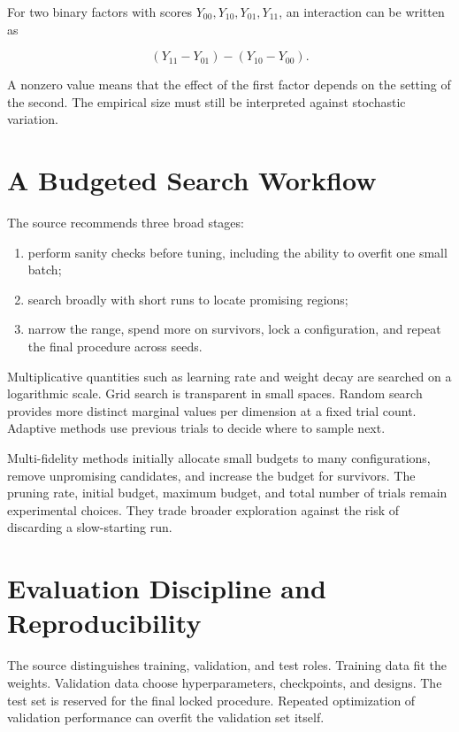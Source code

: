 \documentclass{article}
\begin{document}
For two binary factors with scores $Y_{00},Y_{10},Y_{01},Y_{11}$, an interaction can
be written as

\[
(Y_{11}-Y_{01})-(Y_{10}-Y_{00}).
\]

A nonzero value means that the effect of the first factor depends on the setting of
the second. The empirical size must still be interpreted against stochastic
variation.

\section{A Budgeted Search Workflow}

The source recommends three broad stages:

\begin{enumerate}
\item perform sanity checks before tuning, including the ability to overfit one small
batch;
\item search broadly with short runs to locate promising regions;
\item narrow the range, spend more on survivors, lock a configuration, and repeat the
final procedure across seeds.
\end{enumerate}

Multiplicative quantities such as learning rate and weight decay are searched on a
logarithmic scale. Grid search is transparent in small spaces. Random search provides
more distinct marginal values per dimension at a fixed trial count. Adaptive methods
use previous trials to decide where to sample next.

Multi-fidelity methods initially allocate small budgets to many configurations, remove
unpromising candidates, and increase the budget for survivors. The pruning rate,
initial budget, maximum budget, and total number of trials remain experimental choices.
They trade broader exploration against the risk of discarding a slow-starting run.

\section{Evaluation Discipline and Reproducibility}

The source distinguishes training, validation, and test roles. Training data fit the
weights. Validation data choose hyperparameters, checkpoints, and designs. The test
set is reserved for the final locked procedure. Repeated optimization of validation
performance can overfit the validation set itself.
\end{document}
